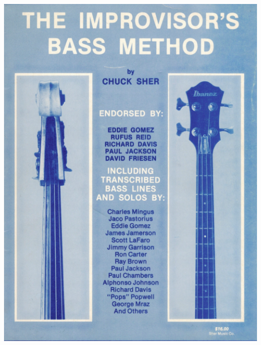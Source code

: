 \documentclass[a4paper]{book}
\begin{document}
\begin{center}
\includegraphics[width=13.862cm,height=18.493cm]{lebluessupportsmethodes-img147.png}
\end{center}
\end{document}
